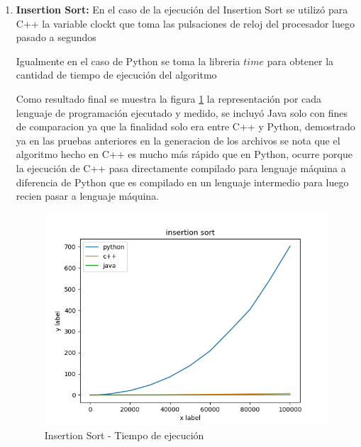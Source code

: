 \documentclass{article}
\begin{document}
\begin{enumerate}
		                \item \textbf{Insertion Sort: }
		                    En el caso de la ejecución del Insertion Sort se utilizó para C++ la variable clock\textunderscore t que toma las pulsaciones de reloj del procesador luego pasado a segundos
		                    
		                    
		                    
		                    Igualmente en el caso de Python se toma la libreria $time$ para obtener la cantidad de tiempo de ejecución del algoritmo
		                    
		                    
		                    
		                    Como resultado final se muestra la figura \ref{fig:insertion_diagram} la representación por cada lenguaje de programación ejecutado y medido, se incluyó Java solo con fines de comparacion ya que la finalidad solo era entre C++ y Python, demostrado ya en las pruebas anteriores en la generacion de los archivos se nota que el algoritmo hecho en C++ es mucho más rápido que en Python, ocurre porque la ejecución de C++ pasa directamente compilado para lenguaje máquina a diferencia de Python que es compilado en un lenguaje intermedio para luego recien pasar a lenguaje máquina.
		                    
		                    \begin{figure}[H]
                				\centering
                				\includegraphics[scale=0.60]{img/insertion_diagram.png}
                				\caption{Insertion Sort - Tiempo de ejecución}
                				\label{fig:insertion_diagram}
                			\end{figure}
		                

\end{enumerate}
\end{document}
